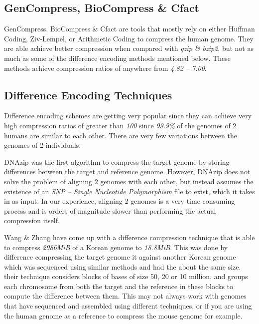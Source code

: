 \documentclass[11pt]{article}
\begin{document}
\subsection{GenCompress, BioCompress \& Cfact}

GenCompress\cite{gencompress}, BioCompress\cite{biocompress} \&
Cfact\cite{cfact} are tools that mostly rely on either Huffman Coding,
Ziv-Lempel\cite{zivlempel}, or Arithmetic Coding to compress the human
genome. They are able achieve better compression when compared with
\textit{gzip \& bzip2}, but not as much as some of the difference
encoding methods mentioned below. These methods achieve compression
ratios of anywhere from \textit{4.82 -- 7.00}.

\subsection{Difference Encoding Techniques}

Difference encoding schemes are getting very popular since they can
achieve very high compression ratios of greater than \textit{100}
since \textit{99.9\%} of the genomes of 2 humans are similar to each
other. There are very few variations between the genomes of 2
individuals.

DNAzip\cite{dnazip} was the first algorithm to compress the target
genome by storing differences between the target and reference
genome. However, DNAzip does not solve the problem of aligning 2
genomes with each other, but instead assumes the existence of an
\textit{SNP -- Single Nucleotide Polymorphism} file to exist, which it
takes in as input. In our experience, aligning 2 genomes is a very
time consuming process and is orders of magnitude slower than
performing the actual compression itself.

Wang \& Zhang\cite{wangzhang} have come up with a difference
compression technique that is able to compress \textit{2986MiB} of a
Korean genome to \textit{18.8MiB}. This was done by difference
compressing the target genome it against another Korean genome which
was sequenced using similar methods and had the about the same
size. their technique considers blocks of bases of size 50, 20 or 10
million, and groups each chromosome from both the target and the
reference in these blocks to compute the difference between them. This
may not always work with genomes that have sequenced and assembled
using different techniques, or if you are using the human genome as a
reference to compress the mouse genome for example.
\end{document}
